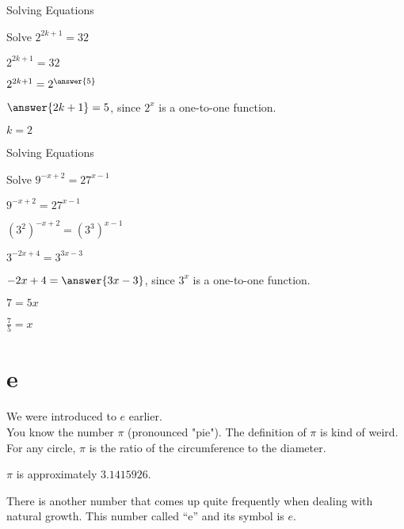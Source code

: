 \documentclass{ximera}
\begin{document}
\begin{example} Solving Equations


Solve $2^{2k+1} = 32$


\begin{explanation}
$2^{2k+1} = 32$

$2^{2k+1} = 2^{\answer{5}}$

$\answer{2k + 1} = 5$, since $2^x$ is a one-to-one function.

$k = 2$
\end{explanation}
\end{example}






\begin{example} Solving Equations


Solve $9^{-x + 2} = 27^{x-1}$


\begin{explanation}

$9^{-x + 2} = 27^{x-1}$

$(3^2)^{-x + 2} = (3^3)^{x-1}$

$3^{-2x+4} = 3^{3x-3}$    

$-2x + 4 = \answer{3x - 3}$, since $3^x$ is a one-to-one function.

$7 = 5x$


$\frac{7}{5} = x$
\end{explanation}
\end{example}














\section{e}


We were introduced to $e$ earlier. \\

You know the number $\pi$ (pronounced "pie").  The definition of $\pi$ is kind of weird.  For any circle, $\pi$ is the ratio of the circumference to the diameter.

$\pi$ is approximately $3.1415926$.





There is another number that comes up quite frequently when dealing with natural growth.  This number called ``e'' and its symbol is $e$.
\end{document}
